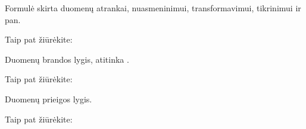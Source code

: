 \documentclass[letterpaper,10pt,lithuanian]{sphinxmanual}
\begin{document}
\begin{fulllineitems}
\label{\detokenize{formatas:prepare}}
\pysigstartsignatures
\pysigline
{}
\pysigstopsignatures
\sphinxAtStartPar
{}

\sphinxAtStartPar
Formulė skirta duomenų atrankai, nuasmeninimui, transformavimui, tikrinimui
ir pan.


\begin{sphinxseealso}{Taip pat žiūrėkite:}

\sphinxAtStartPar
{\hyperref[\detokenize{formules:formules}]{}}


\end{sphinxseealso}


\end{fulllineitems}


\begin{fulllineitems}
\label{\detokenize{formatas:level}}
\pysigstartsignatures
\pysigline
{}
\pysigstopsignatures
\sphinxAtStartPar
{}

\sphinxAtStartPar
Duomenų brandos lygis, atitinka .


\begin{sphinxseealso}{Taip pat žiūrėkite:}

\sphinxAtStartPar
{\hyperref[\detokenize{branda:level}]{}}


\end{sphinxseealso}


\end{fulllineitems}


\begin{fulllineitems}
\label{\detokenize{formatas:access}}
\pysigstartsignatures
\pysigline
{}
\pysigstopsignatures
\sphinxAtStartPar
{}

\sphinxAtStartPar
Duomenų prieigos lygis.


\begin{sphinxseealso}{Taip pat žiūrėkite:}

\sphinxAtStartPar
{\hyperref[\detokenize{prieiga:access}]{}}


\end{sphinxseealso}


\end{fulllineitems}
\end{document}
